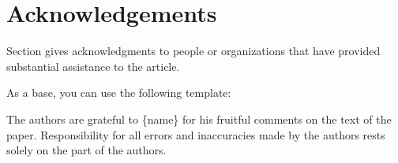 \section{Acknowledgements}
\label{sec:Acknowledgement}

Section gives acknowledgments to people or organizations that have provided substantial assistance to the article.

As a base, you can use the following template:

The authors are grateful to \{name\} for his fruitful comments on the text of the
paper. Responsibility for all errors and inaccuracies made by the authors rests solely on the part of
the authors.
